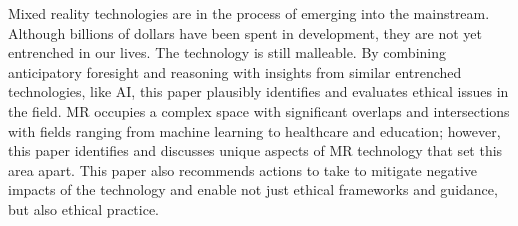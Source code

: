 Mixed reality technologies are in the process of emerging into the mainstream. Although billions of dollars have been spent in development, they are not yet entrenched in our lives. The technology is still malleable. By combining anticipatory foresight and reasoning with insights from similar entrenched technologies, like AI, this paper plausibly identifies and evaluates ethical issues in the field. MR occupies a complex space with significant overlaps and intersections with fields ranging from machine learning to healthcare and education; however, this paper identifies and discusses unique aspects of MR technology that set this area apart. This paper also recommends actions to take to mitigate negative impacts of the technology and enable not just ethical frameworks and guidance, but also ethical practice.
